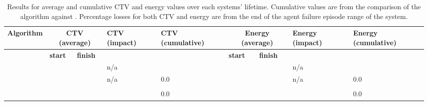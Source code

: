 \begin{table}[ht]
	\centering
\begin{tabular}{
			|p{}|p{0.05\textwidth}|p{}|p{}|p{}|p{0.06\textwidth}|p{}|p{0.10\textwidth}|p{}|
		}
\hline
\textbf{Algorithm}
	& \multicolumn{2}{c|}{\textbf{CTV \newline (average)}}
	& \textbf{CTV \newline(impact)}
	& \textbf{CTV \newline(cumulative)}
	& \multicolumn{2}{c|}{\textbf{Energy \newline (average)}}
	& \textbf{Energy \newline (impact)}
	& \textbf{Energy  \newline(cumulative)} \\
\hline & \textbf{start} & \textbf{finish }& & & \textbf{start} & \textbf{finish} & &  \\
\hline
		\algorithmBalancedSimple{}{}
			& \resultsSimpleCTVBalancedStart{}{} &  \resultsSimpleCTVBalancedEnd{}{} 
			& n/a
			& \resultsSimpleCumulativeCTVComparison{}{}
			& \resultsSimpleEnergyBalancedStart{}{} &  \resultsSimpleEnergyBalancedEnd{}{}
			& n/a
			& \resultsSimpleCumulativeEnergyComparison{}{} \\
		\algorithmDynaQSimple{}{} 
			& \resultsSimpleCTVQRoutingStart{}{} &  \resultsSimpleCTVQRoutingEnd{}{} 
			& n/a
			& $0.0$
			& \resultsSimpleEnergyQRoutingStart{}{} &  \resultsSimpleEnergyQRoutingEnd{}{}
			& n/a
			& $0.0$ \\
			
		\algorithmFailure{}{} 
		& \resultsNodeFailureCTVBalancedStart{}{}  &  \resultsNodeFailureCTVBalancedEnd{}{} 
		& \resultsNodeFailureCTVBalancedImpactDiff{}{}
		& \resultsNodeFailureCumulativeCTVComparison{}{}
		& \resultsNodeFailureEnergyBalancedStart{}{} &  \resultsNodeFailureEnergyBalancedEnd{}{}
		& \resultsNodeFailureEnergyBalancedImpactDiff{}{} 
		& \resultsNodeFailureCumulativeEnergyComparison{}{} \\
		\algorithmDynaQFailure{}{} 
		& \resultsNodeFailureCTVQRoutingStart{}{} &  \resultsNodeFailureCTVQRoutingEnd{}{} 
		& \resultsNodeFailureCTVQRoutingImpactDiff{}{}
		& $0.0$
		& \resultsNodeFailureEnergyQRoutingEnd{}{}  &   \resultsNodeFailureEnergyQRoutingEnd{}{}
		& \resultsNodeFailureEnergyQRoutingImpactDiff{}{}
		& $0.0$ \\
\hline
\end{tabular}
\captionsetup{labelfont=bf,singlelinecheck=on,justification=raggedright}
\caption{Results for average and cumulative CTV and energy values over each systems' lifetime. Cumulative values are from the comparison of the \acronymWSNOptimisation{}{} algorithm against \acronymBaseline{}{}. Percentage losses for both CTV and energy are from the end of the agent failure episode range of the \simulationNodeFailure{}{} system.}
\label{table:results_main}
\end{table}

